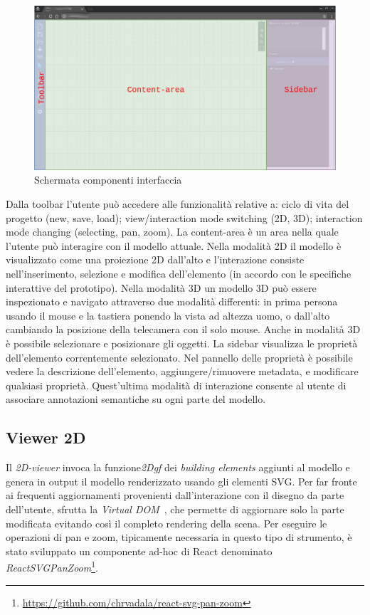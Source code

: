 \begin{figure}[htbp] %
   \centering
   \includegraphics[width=1\linewidth]{images/mock-interfaccia}
   \caption{Schermata componenti interfaccia}
   \label{fig:interfaccia}
\end{figure}
\newpage
Dalla toolbar l'utente pu\`o accedere alle funzionalit\`a relative a: ciclo di vita del progetto (new, save, load);
view/interaction mode switching (2D, 3D); interaction mode changing (selecting, pan, zoom).
La content-area \`e un area nella quale l'utente pu\`o interagire con il modello attuale. Nella modalit\`a 2D
il modello \`e visualizzato come una proiezione 2D dall'alto e l'interazione consiste nell'inserimento, selezione e modifica
dell'elemento (in accordo con le specifiche interattive del prototipo). Nella modalità 3D un modello 3D pu\`o essere
inspezionato e navigato attraverso due modalità differenti: in prima persona usando il mouse e la tastiera ponendo la vista
ad altezza uomo, o dall'alto cambiando la posizione della telecamera con il solo mouse. Anche in modalità 3D è possibile
selezionare e posizionare gli oggetti.
La sidebar visualizza le propriet\`a dell'elemento correntemente selezionato. Nel pannello delle propriet\`a \`e possibile
vedere la descrizione dell'elemento, aggiungere/rimuovere metadata, e modificare qualsiasi propriet\`a.
Quest'ultima modalità di interazione consente al utente di associare annotazioni semantiche su ogni parte del modello.
\newpage

\subsection{Viewer 2D}
Il \emph{2D-viewer} invoca la funzione\emph{2Dgf} dei \emph{building elements} aggiunti al modello e genera in output il modello
renderizzato usando gli elementi SVG.
Per far fronte ai frequenti aggiornamenti provenienti dall'interazione con il disegno da parte dell'utente,
sfrutta la \emph{Virtual DOM}~\cite{vdom}, che permette di aggiornare solo la parte modificata evitando così
il completo rendering della scena. Per eseguire le operazioni di pan e zoom, tipicamente necessaria in questo
tipo di strumento, è stato sviluppato un componente ad-hoc
di React denominato \emph{ReactSVGPanZoom}\footnote{\url{https://github.com/chrvadala/react-svg-pan-zoom}}.\\

